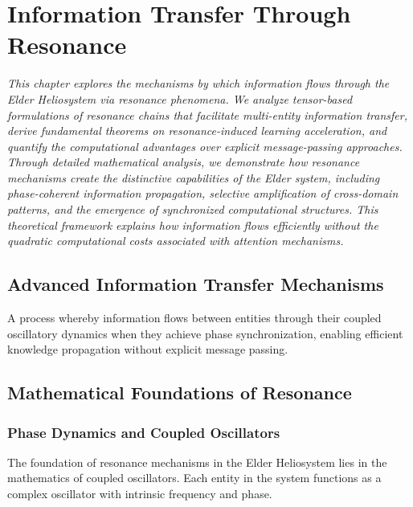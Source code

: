 \chapter{Information Transfer Through Resonance}

\textit{This chapter explores the mechanisms by which information flows through the Elder Heliosystem via resonance phenomena. We analyze tensor-based formulations of resonance chains that facilitate multi-entity information transfer, derive fundamental theorems on resonance-induced learning acceleration, and quantify the computational advantages over explicit message-passing approaches. Through detailed mathematical analysis, we demonstrate how resonance mechanisms create the distinctive capabilities of the Elder system, including phase-coherent information propagation, selective amplification of cross-domain patterns, and the emergence of synchronized computational structures. This theoretical framework explains how information flows efficiently without the quadratic computational costs associated with attention mechanisms.}

\section{Advanced Information Transfer Mechanisms}

\begin{definition}
A process whereby information flows between entities through their coupled oscillatory dynamics when they achieve phase synchronization, enabling efficient knowledge propagation without explicit message passing.
\end{definition}

\section{Mathematical Foundations of Resonance}

\subsection{Phase Dynamics and Coupled Oscillators}

The foundation of resonance mechanisms in the Elder Heliosystem lies in the mathematics of coupled oscillators. Each entity in the system functions as a complex oscillator with intrinsic frequency and phase.

